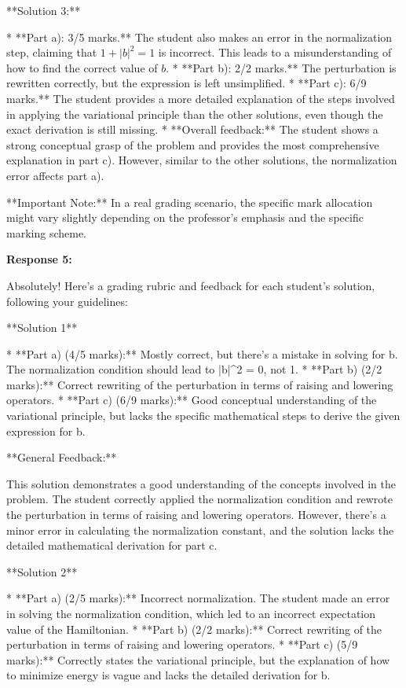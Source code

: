 \documentclass[a4paper,11pt]{article}
\begin{document}
**Solution 3:**

* **Part a): 3/5 marks.** The student also makes an error in the normalization step, claiming that  \(1 + |b|^2 = 1\) is incorrect. This leads to a misunderstanding of how to find the correct value of \(b\). 
* **Part b): 2/2 marks.**  The perturbation is rewritten correctly, but the expression is left unsimplified.
* **Part c): 6/9 marks.** The student provides a more detailed explanation of the steps involved in applying the variational principle than the other solutions, even though the exact derivation is still missing.
* **Overall feedback:**  The student shows a strong conceptual grasp of the problem and provides the most comprehensive explanation in part c). However, similar to the other solutions, the normalization error affects part a).

**Important Note:** In a real grading scenario, the specific mark allocation might vary slightly depending on the professor's emphasis and the specific marking scheme. 

\bigskip    
\textbf{Response 5:}

Absolutely! Here's a grading rubric and feedback for each student's solution, following your guidelines:

**Solution 1**

* **Part a) (4/5 marks):** Mostly correct, but there's a mistake in solving for b. The normalization condition should lead to |b|^2 = 0, not 1.
* **Part b) (2/2 marks):**  Correct rewriting of the perturbation in terms of raising and lowering operators.
* **Part c) (6/9 marks):** Good conceptual understanding of the variational principle, but lacks the specific mathematical steps to derive the given expression for b.

**General Feedback:**

This solution demonstrates a good understanding of the concepts involved in the problem. The student correctly applied the normalization condition and rewrote the perturbation in terms of raising and lowering operators. However, there's a minor error in calculating the normalization constant, and the solution lacks the detailed mathematical derivation for part c.

**Solution 2**

* **Part a) (2/5 marks):** Incorrect normalization. The student made an error in solving the normalization condition, which led to an incorrect expectation value of the Hamiltonian.
* **Part b) (2/2 marks):** Correct rewriting of the perturbation in terms of raising and lowering operators.
* **Part c) (5/9 marks):**  Correctly states the variational principle, but the explanation of how to minimize energy is vague and lacks the detailed derivation for b.
\end{document}
